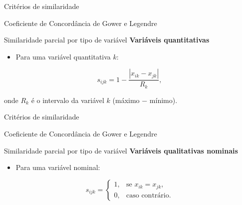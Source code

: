 \documentclass[
  ignorenonframetext,
  aspectratio=169,
]{beamer}
\providecommand{\tightlist}{%
  \setlength{\itemsep}{0pt}\setlength{\parskip}{0pt}}
\begin{document}
\begin{frame}{Critérios de similaridade}
\protect{}\label{crituxe9rios-de-similaridade-9}
\begin{block}{Coeficiente de Concordância de Gower e Legendre}
\protect{}\label{coeficiente-de-concorduxe2ncia-de-gower-e-legendre-3}
\begin{block}{Similaridade parcial por tipo de variável}
\protect{}\label{similaridade-parcial-por-tipo-de-variuxe1vel}
\textbf{Variáveis quantitativas}

\begin{itemize}
\tightlist
\item
  Para uma variável quantitativa \(k\):
\end{itemize}

\[
s_{ijk}
=
1 - \dfrac{|x_{ik} - x_{jk}|}{R_k},
\]

onde \(R_k\) é o intervalo da variável \(k\) (máximo − mínimo).
\end{block}
\end{block}
\end{frame}

\begin{frame}{Critérios de similaridade}
\protect{}\label{crituxe9rios-de-similaridade-10}
\begin{block}{Coeficiente de Concordância de Gower e Legendre}
\protect{}\label{coeficiente-de-concorduxe2ncia-de-gower-e-legendre-4}
\begin{block}{Similaridade parcial por tipo de variável}
\protect{}\label{similaridade-parcial-por-tipo-de-variuxe1vel-1}
\textbf{Variáveis qualitativas nominais}

\begin{itemize}
\tightlist
\item
  Para uma variável nominal:
\end{itemize}

\[
s_{ijk}
=
\begin{cases}
1, & \text{se } x_{ik} = x_{jk}, \\
0, & \text{caso contrário}.
\end{cases}
\]
\end{block}
\end{block}
\end{frame}
\end{document}
